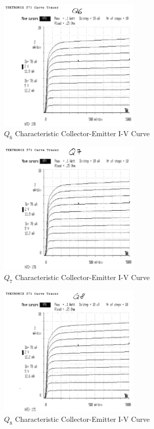 \documentclass[titlepage, letterpaper, 10.5pt]{article}
\begin{document}
\begin{figure}[ht]
	\centering
	\includegraphics[width=0.6\textwidth]{results/q6-characteristics}
	\caption{$Q_{6}$ Characteristic Collector-Emitter I-V Curve}
\end{figure}

\begin{figure}[ht]
	\centering
	\includegraphics[width=0.6\textwidth]{results/q7-characteristics}
	\caption{$Q_{7}$ Characteristic Collector-Emitter I-V Curve}
\end{figure}

\begin{figure}[ht]
	\centering
	\includegraphics[width=0.6\textwidth]{results/q8-characteristics}
	\caption{$Q_{8}$ Characteristic Collector-Emitter I-V Curve}
\end{figure}
\end{document}
